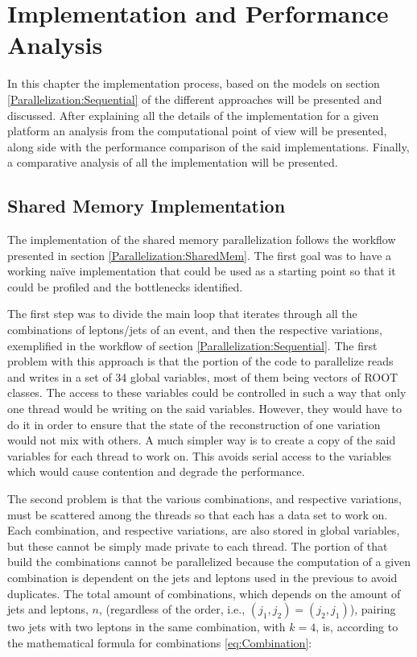 \chapter{Implementation and Performance Analysis}
\label{Implementation}

In this chapter the implementation process, based on the models on section \ref{Parallelization:Sequential} of the different approaches will be presented and discussed. After explaining all the details of the implementation for a given platform an analysis from the computational point of view will be presented, along side with the performance comparison of the said implementations. Finally, a comparative analysis of all the implementation will be presented.

\section{Shared Memory Implementation}
\label{Implementation:SharedMem}

The implementation of the shared memory parallelization follows the workflow presented in section \ref{Parallelization:SharedMem}. The first goal was to have a working na\"{i}ve implementation that could be used as a starting point so that it could be profiled and the bottlenecks identified.

The first step was to divide the \ttDilepKinFit main loop that iterates through all the combinations of leptons/jets of an event, and then the respective variations, exemplified in the workflow of section \ref{Parallelization:Sequential}. The first problem with this approach is that the portion of the code to parallelize reads and writes in a set of 34 global variables, most of them being vectors of ROOT classes. The access to these variables could be controlled in such a way that only one thread would be writing on the said variables. However, they would have to do it in order to ensure that the state of the reconstruction of one variation would not mix with others. A much simpler way is to create a copy of the said variables for each thread to work on. This avoids serial access to the variables which would cause contention and degrade the performance.

The second problem is that the various combinations, and respective variations, must be scattered among the threads so that each has a data set to work on. Each combination, and respective variations, are also stored in global variables, but these cannot be simply made private to each thread. The portion of \ttDilepKinFit that build the combinations cannot be parallelized because the computation of a given combination is dependent on the jets and leptons used in the previous to avoid duplicates. The total amount of combinations, which depends on the amount of jets and leptons, $n$, (regardless of the order, i.e., $(j_1, j_2) = (j_2, j_1)$), pairing two jets with two leptons in the same combination, with $k = 4$, is, according to the mathematical formula for combinations \ref{eq:Combination}:

